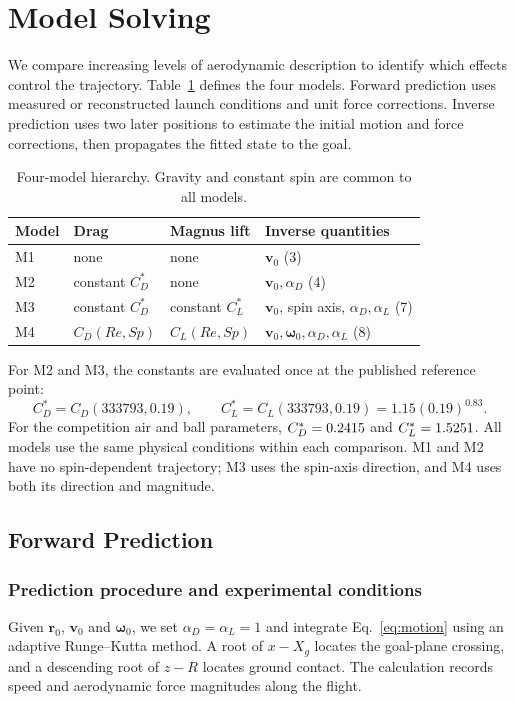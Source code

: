 \documentclass[12pt,letterpaper]{article}
\begin{document}
\section{Model Solving}\label{sec:solving}
We compare increasing levels of aerodynamic description to identify which effects control the trajectory. Table~\ref{tab:models} defines the four models. Forward prediction uses measured or reconstructed launch conditions and unit force corrections. Inverse prediction uses two later positions to estimate the initial motion and force corrections, then propagates the fitted state to the goal.
\begin{table}[H]\centering\small
\caption{Four-model hierarchy. Gravity and constant spin are common to all models.}\label{tab:models}
\begin{tabular}{llll}\toprule
Model & Drag & Magnus lift & Inverse quantities\\\midrule
M1 & none & none & $\boldsymbol v_0$ (3)\\
M2 & constant $C_D^*$ & none & $\boldsymbol v_0,\alpha_D$ (4)\\
M3 & constant $C_D^*$ & constant $C_L^*$ & $\boldsymbol v_0$, spin axis, $\alpha_D,\alpha_L$ (7)\\
M4 & $C_D(Re,Sp)$ & $C_L(Re,Sp)$ & $\boldsymbol v_0,\boldsymbol\omega_0,\alpha_D,\alpha_L$ (8)\\\bottomrule
\end{tabular}\end{table}
For M2 and M3, the constants are evaluated once at the published reference point:
\begin{equation}
C_D^*=C_D(333793,0.19),\qquad C_L^*=C_L(333793,0.19)=1.15(0.19)^{0.83}.
\end{equation}
For the competition air and ball parameters, $C_D^*=0.2415$ and $C_L^*=1.5251$. All models use the same physical conditions within each comparison. M1 and M2 have no spin-dependent trajectory; M3 uses the spin-axis direction, and M4 uses both its direction and magnitude.

\subsection{Forward Prediction}\label{sec:forward}
\subsubsection{Prediction procedure and experimental conditions}
Given $\boldsymbol r_0$, $\boldsymbol v_0$ and $\boldsymbol\omega_0$, we set $\alpha_D=\alpha_L=1$ and integrate Eq.~\eqref{eq:motion} using an adaptive Runge--Kutta method. A root of $x-X_g$ locates the goal-plane crossing, and a descending root of $z-R$ locates ground contact. The calculation records speed and aerodynamic force magnitudes along the flight.
\end{document}
